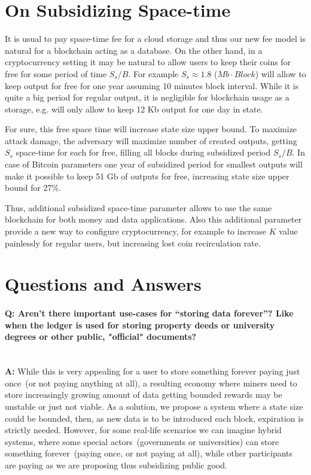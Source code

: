 \documentclass[]{llncs}   %
\newcommand{\state}{state}
\begin{document}
\section{On Subsidizing Space-time}
\label{sec:subsidy}

It is usual to pay space-time fee for a cloud storage and thus our new fee model is natural for a blockchain acting as a database. On the other hand, in a cryptocurrency setting it may be natural to allow users to keep their coins for free for some period of time $S_s/B$. For example $S_s \approx 1.8$ ($Mb \cdot Block$) will allow to keep output for free for one year assuming 10 minutes block interval. While it is quite a big period for regular output, it is negligible for blockchain usage as a storage, e.g. will only allow to keep 12 Kb output for one day in \state{}.

For sure, this free space time will increase \state{} size upper bound. To maximize attack damage, the adversary will maximize number of created outputs, getting $S_s$ space-time for each for free, filling all blocks during subsidized period $S_s/B$. In case of Bitcoin parameters one year of subsidized period for smallest outputs will make it possible to keep 51 Gb of outputs for free, increasing \state{} size upper bound for 27\%.

Thus, additional subsidized space-time parameter allows to use the same blockchain for both money and data applications. Also this additional parameter provide a new way to configure cryptocurrency, for example to increase $K$ value painlessly for regular users, but increasing lost coin recirculation rate.

\section{Questions and Answers}


\paragraph{\textbf{Q: } Aren't there important use-cases for ``storing data forever''? Like when the ledger is used for storing property deeds or university degrees or other public, "official" documents?}~\\
\textbf{A: } While this is very appealing for a user to store something forever paying just once~(or not paying anything at all), a resulting economy where miners need to store increasingly growing amount of data getting bounded rewards may be unstable or just not viable. As a solution, we propose a system where a state size could be bounded, then, as new data is to be introduced each block, expiration is strictly needed. However, for some real-life scenarios we can imagine hybrid systems, where some special actors~(governments or universities) can store something forever~(paying once, or not paying at all), while other participants are paying as we are proposing thus subsidizing public good.
\end{document}
